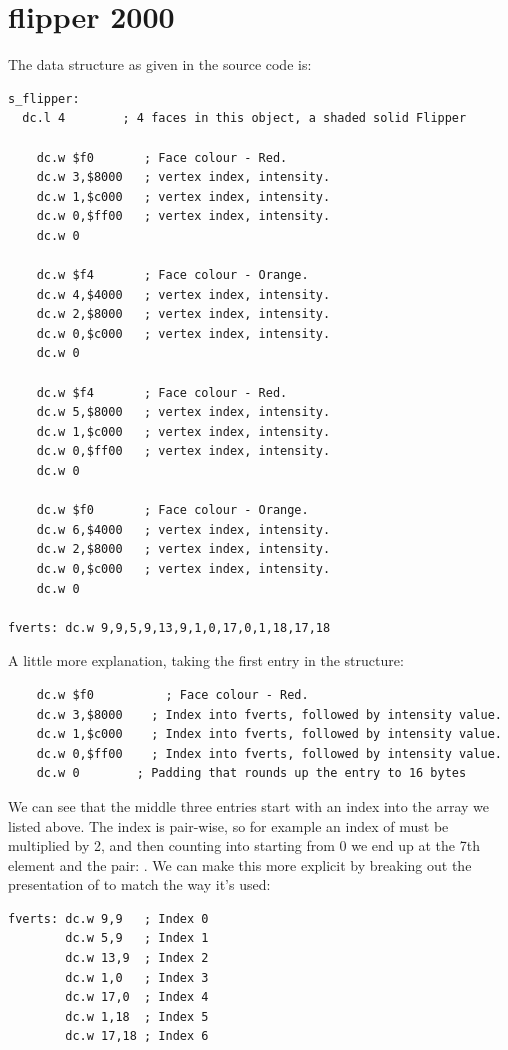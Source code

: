 \chapter{flipper 2000}
\lhead[tempest 2000]{}
\label{sec:listing}
\lstset{style=68KStyle}

The data structure as given in the source code is:

\begin{lstlisting}
s_flipper: 
  dc.l 4        ; 4 faces in this object, a shaded solid Flipper
    
	dc.w $f0       ; Face colour - Red.
	dc.w 3,$8000   ; vertex index, intensity.
	dc.w 1,$c000   ; vertex index, intensity.
	dc.w 0,$ff00   ; vertex index, intensity.
	dc.w 0
    
	dc.w $f4       ; Face colour - Orange.
	dc.w 4,$4000   ; vertex index, intensity.
	dc.w 2,$8000   ; vertex index, intensity.
	dc.w 0,$c000   ; vertex index, intensity.
	dc.w 0
    
	dc.w $f4       ; Face colour - Red.
	dc.w 5,$8000   ; vertex index, intensity.
	dc.w 1,$c000   ; vertex index, intensity.
	dc.w 0,$ff00   ; vertex index, intensity.
	dc.w 0
    
	dc.w $f0       ; Face colour - Orange.
	dc.w 6,$4000   ; vertex index, intensity.
	dc.w 2,$8000   ; vertex index, intensity.
	dc.w 0,$c000   ; vertex index, intensity.
	dc.w 0

fverts: dc.w 9,9,5,9,13,9,1,0,17,0,1,18,17,18
\end{lstlisting}

A little more explanation, taking the first entry in the structure:
\begin{lstlisting}
	dc.w $f0		  ; Face colour - Red.
	dc.w 3,$8000	; Index into fverts, followed by intensity value.
	dc.w 1,$c000	; Index into fverts, followed by intensity value.
	dc.w 0,$ff00	; Index into fverts, followed by intensity value.
	dc.w 0        ; Padding that rounds up the entry to 16 bytes
\end{lstlisting}

We can see that the middle three entries start with an index into the array  we listed above.
The index is pair-wise, so for example an index of  must be multiplied by 2, and then counting into 
starting from 0 we end up at the 7th element and the pair: . We can make this more explicit by breaking out the
presentation of  to match the way it's used:
\begin{lstlisting}
fverts: dc.w 9,9   ; Index 0
        dc.w 5,9   ; Index 1
        dc.w 13,9  ; Index 2
        dc.w 1,0   ; Index 3
        dc.w 17,0  ; Index 4
        dc.w 1,18  ; Index 5
        dc.w 17,18 ; Index 6
\end{lstlisting}

